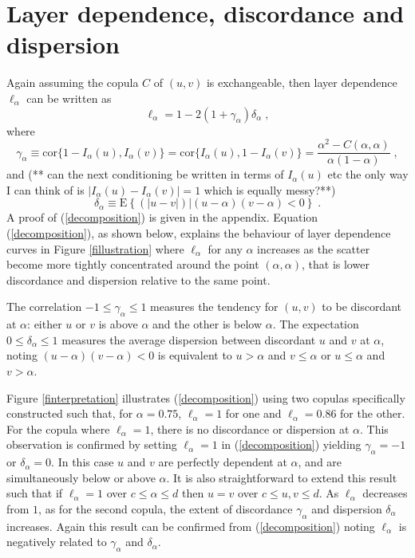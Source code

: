 \documentclass[authoryear]{elsarticle}
\newcommand{\E}{{\mathrm E}}
\newcommand{\cor}{\mathrm{cor}}
\newcommand{\eref}[1]{(\ref{#1})}
\newcommand{\fref}[1]{Figure \ref{#1}}
\begin{document}
\section{Layer dependence, discordance and dispersion}\label{sdecompose}

Again assuming the copula $C$ of $(u,v)$ is exchangeable, then layer dependence $\ell_\alpha$ can be written as
\begin{equation}\label{decomposition}
\ell_\alpha = 1-2(1+\gamma_\alpha) \delta_\alpha \;,
\end{equation}
where
$$
\gamma_\alpha \equiv \cor\{1-I_\alpha(u),I_\alpha(v)\} =\cor\{I_\alpha(u),1-I_\alpha(v)\}=\frac{\alpha^2-C(\alpha,\alpha)}{\alpha(1-\alpha)}\;,
$$
and (** can the next conditioning be written in terms of $I_\alpha(u)$ etc the only way I can think of is $|I_\alpha(u)-I_\alpha(v)|=1$ which is equally messy?**)
$$
\delta_\alpha \equiv\E\left\{(|u-v|)|(u-\alpha)(v-\alpha)<0\right\}  \; .
$$
A proof of \eref{decomposition} is given in the appendix. Equation \eref{decomposition}, as shown below, explains the behaviour of layer dependence curves in \fref{fillustration} where $\ell_\alpha$ for any $\alpha$ increases as the scatter become more tightly concentrated  around the point $(\alpha,\alpha)$, that is lower discordance and dispersion relative to the same point.

The correlation $-1\leq\gamma_\alpha\leq 1$ measures the tendency for $(u,v)$ to be discordant at $\alpha$: either $u$ or $v$ is above $\alpha$ and the other is below $\alpha$. The expectation $0\leq \delta_\alpha\leq 1$ measures the average dispersion between discordant $u$ and $v$ at $\alpha$, noting $(u-\alpha)(v-\alpha)<0$ is equivalent to $u>\alpha$ and $v\le\alpha$ or $u\le\alpha$ and $v>\alpha$.


\fref{finterpretation} illustrates \eref{decomposition} using two copulas specifically constructed such that, for $\alpha=0.75$, $\ell_\alpha=1$ for one and $\ell_\alpha=0.86$ for the other. For the copula where $\ell_\alpha=1$, there is no discordance or dispersion at $\alpha$. This observation is confirmed by setting $\ell_\alpha=1$ in \eref{decomposition} yielding $\gamma_\alpha=-1$ or $\delta_\alpha=0$. In this case $u$ and $v$ are perfectly dependent at $\alpha$, and are simultaneously below or above $\alpha$. It is also straightforward to extend this result such that if $\ell_\alpha=1$ over $c\le\alpha\le d$ then $u=v$ over $c\le u,v\le d$. As $\ell_\alpha$ decreases from $1$, as for the second copula, the extent of discordance $\gamma_\alpha$ and dispersion $\delta_\alpha$ increases. Again this result can be confirmed from \eref{decomposition} noting $\ell_\alpha$ is negatively related to $\gamma_\alpha$ and $\delta_\alpha$.
\end{document}
